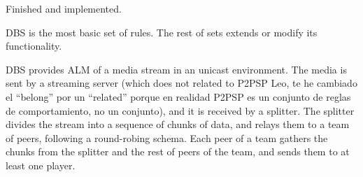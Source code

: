 
\label{sec:DBS}

\begin{notex}
  Finished and implemented.
\end{notex}

\acrshort{DBS} is the most basic set of rules. The rest of sets extends or modify
its functionality.

DBS provides \acrshort{ALM} of a \gls{media} \gls{stream} in an
\gls{unicast} environment. The media is sent by a streaming
\gls{server} (which does not related to P2PSP {\color{red} Leo, te he
  cambiado el ``belong'' por un ``related'' porque en realidad P2PSP
  es un conjunto de reglas de comportamiento, no un conjunto}), and it
is received by a \gls{splitter}. The
splitter divides the stream into a sequence of \gls{chunk}s of data,
and relays them to a \gls{team} of peers, following a round-robing
schema. Each peer of a team gathers the chunks from the splitter and
the rest of peers of the team, and sends them to at least one
\gls{player}.

\begin{comment}
In single layered streams\footnote{Each layer of a
  scalable stream is received by a different peer attached to the same
  player capable or render scalable media.}, each peer is spawned by a
player (normal users should not run peers directly).
\end{comment}

\begin{comment}
/* quitar: We define the set of teams as
$\{T\}$,
and enumerate the peers in the team $T$ as $T=\{P_1,\cdots,P_{|T|}\}$. */
\end{comment}
